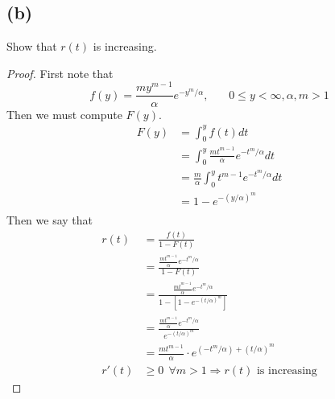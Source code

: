 \documentclass{article}
\theoremstyle{definition}
\begin{document}
    \subsection*{(b)}
        Show that $r(t)$ is increasing.
        \begin{proof}
            First note that 
            \[
                f(y) = \frac{my^{m-1}}{\alpha}e^{-y^m / \alpha}, \ \ \ \ \ \ \ \ 0 \leq y < \infty, \alpha, m > 1
            \]
            Then we must compute $F(y)$.
            \begin{align*}
                F(y) &= \int_0^y f(t) dt\\
                &= \int_0^y \frac{mt^{m-1}}{\alpha}e^{-t^m / \alpha}dt \\
                &= \frac{m}{\alpha} \int_0^y t^{m - 1} e^{-t^m / \alpha} dt \\
                & = 1 - e^{-(y / \alpha)^m}\\
            \end{align*}
            Then we say that 
            \begin{align*}
                r(t) &= \frac{f(t)}{1- F(t)}\\
                &= \frac{\frac{mt^{m-1}}{\alpha}e^{-t^m / \alpha}}{1 - F(t)}\\
                &= \frac{\frac{mt^{m-1}}{\alpha}e^{-t^m / \alpha}}{1 - [1 - e^{-(t / \alpha)^m}]}\\
                &= \frac{\frac{mt^{m-1}}{\alpha}e^{-t^m / \alpha}}{e^{-(t / \alpha)^m}}\\
                &= \frac{mt^{m-1}}{\alpha} \cdot e^{(-t ^ m / \alpha) + (t / \alpha)^m}\\
                r'(t) &\geq 0 \ \ \forall m > 1 \Longrightarrow r(t) \text{ is increasing} 
            \end{align*}
        \end{proof}
\end{document}
